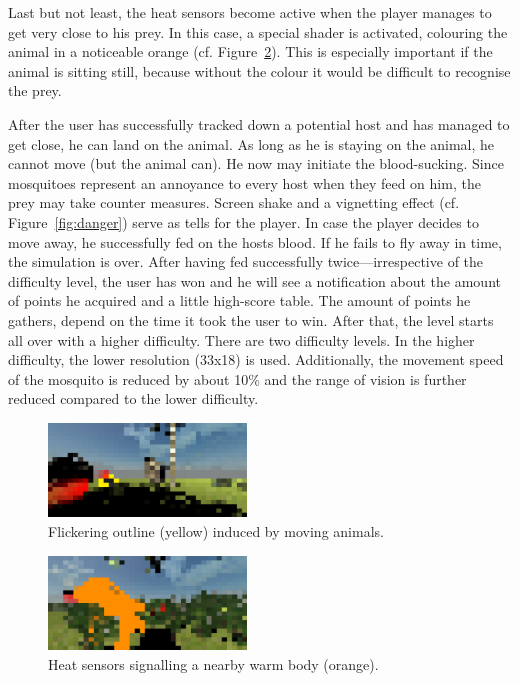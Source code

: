 \documentclass{sig-alternate-05-2015}
\begin{document}
Last but not least, the heat sensors become active when the player manages to get very close to his prey. In this case, a special shader is activated, colouring the animal in a noticeable orange (cf. Figure~\ref{fig:heat}). This is especially important if the animal is sitting still, because without the colour it would be difficult to recognise the prey.


After the user has successfully tracked down a potential host and has managed to get close, he can land on the animal. As long as he is staying on the animal, he cannot move (but the animal can). He now may initiate the blood-sucking. Since mosquitoes represent an annoyance to every host when they feed on him, the prey may take counter measures. Screen shake and a vignetting effect (cf. Figure~\ref{fig:danger}) serve as tells for the player. In case the player decides to move away, he successfully fed on the hosts blood. If he fails to fly away in time, the simulation is over. After having fed successfully twice---irrespective of the difficulty level, the user has won and he will see a notification about the amount of points he acquired and a little high-score table. The amount of points he gathers, depend on the time it took the user to win. After that, the level starts all over with a higher difficulty. There are two difficulty levels. In the higher difficulty, the lower resolution (33x18) is used. Additionally, the movement speed of the mosquito is reduced by about 10\% and the range of vision is further reduced compared to the lower difficulty.

\begin{figure}[ht!]
\includegraphics[width=0.47\textwidth]{Figures/flickr.png}
\caption{Flickering outline (yellow) induced by moving animals.}
\label{fig:flickr}
\end{figure}


\begin{figure}[ht!]
\includegraphics[width=0.47\textwidth]{Figures/heat.png}
\caption{Heat sensors signalling a nearby warm body (orange).}
\label{fig:heat}
\end{figure}
\end{document}
